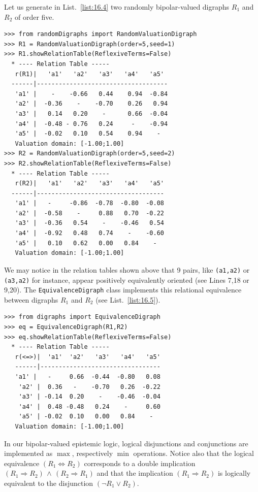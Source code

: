 Let us generate in List.~\vref{list:16.4} two randomly bipolar-valued digraphs $R_1$ and $R_2$ of order five.
\begin{lstlisting}[caption={Two random bipolar-valued digraphs},label=list:16.4]
>>> from randomDigraphs import RandomValuationDigraph
>>> R1 = RandomValuationDigraph(order=5,seed=1)
>>> R1.showRelationTable(ReflexiveTerms=False)
  * ---- Relation Table -----
   r(R1)|   'a1'   'a2'   'a3'   'a4'   'a5'	  
  ------|------------------------------------
   'a1' |    - 	  -0.66	  0.44	  0.94	-0.84	 
   'a2' |  -0.36    - 	 -0.70	  0.26	 0.94	 
   'a3' |   0.14   0.20	   - 	  0.66	-0.04	 
   'a4' |  -0.48 - 0.76	  0.24	   -  	-0.94	 
   'a5' |  -0.02   0.10	  0.54	  0.94    - 	 
   Valuation domain: [-1.00;1.00]
>>> R2 = RandomValuationDigraph(order=5,seed=2)
>>> R2.showRelationTable(ReflexiveTerms=False)
  * ---- Relation Table -----
   r(R2)|   'a1'   'a2'   'a3'   'a4'   'a5'	  
  ------|-----------------------------------
   'a1' |   -     -0.86  -0.78  -0.80  -0.08	 
   'a2' |  -0.58    -     0.88   0.70  -0.22	 
   'a3' |  -0.36   0.54	   -    -0.46   0.54	 
   'a4' |  -0.92   0.48   0.74    -    -0.60	 
   'a5' |   0.10   0.62   0.00   0.84    - 	 
   Valuation domain: [-1.00;1.00]
\end{lstlisting}
We may notice in the relation tables shown above that 9 pairs, like \texttt{(a1,a2)} or \texttt{(a3,a2)} for instance, appear positively equivalently oriented (see Lines 7,18 or 9,20). The \texttt{EquivalenceDigraph} class implements this relational equivalence between digraphs $R_1$ and $R_2$ (see List.~\vref{list:16.5}).
\begin{lstlisting}[caption={Bipolar-valued Equivalence Digraph},label=list:16.5]
>>> from digraphs import EquivalenceDigraph
>>> eq = EquivalenceDigraph(R1,R2)
>>> eq.showRelationTable(ReflexiveTerms=False)
  * ---- Relation Table -----
   r(<=>)|  'a1'  'a2'   'a3'   'a4'   'a5'	  
   ------|---------------------------------
   'a1' |   - 	  0.66  -0.44  -0.80   0.08	 
    'a2' |  0.36   -    -0.70   0.26  -0.22	 
    'a3' | -0.14  0.20    -    -0.46  -0.04	 
    'a4' |  0.48 -0.48   0.24    -     0.60	 
    'a5' | -0.02  0.10   0.00   0.84    - 	 
   Valuation domain: [-1.00;1.00]
\end{lstlisting}

In our bipolar-valued epistemic logic, logical disjunctions and conjunctions are implemented as $\max$, respectively $\min$ operations. Notice also that the logical equivalence $(R_1 \Leftrightarrow R_2)$ corresponds to a double implication $(R_1 \Rightarrow R_2)\, \wedge \, (R_2 \Rightarrow  R_1)$ and that the implication $(R_1 \Rightarrow R_2)$ is logically equivalent to the disjunction $(\neg R_1 \vee R_2)$.

